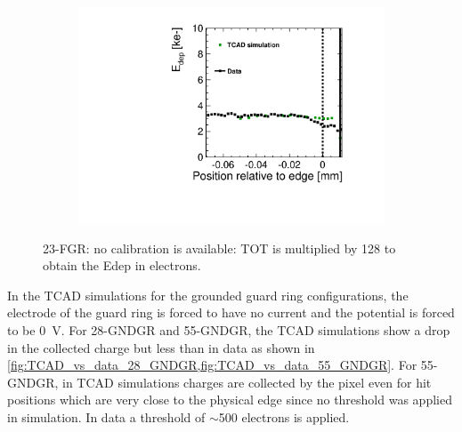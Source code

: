 \begin{figure}[htbp]
  \centering
  \begin{subfigure}[b]{0.5\textwidth}

    \caption{}
  \end{subfigure}\hfill
  \begin{subfigure}[b]{0.5\textwidth}
    \includegraphics[width=\textwidth]{figures/ActiveEdge/TCAD_data_23_FGR.pdf}
    \caption{}
  \end{subfigure}
  \caption{23-FGR: no calibration is available: TOT is multiplied by 128 to obtain the Edep in electrons.}
  \label{fig:TCAD_vs_data_23_FGR}
\end{figure}

In the TCAD simulations for the grounded guard ring configurations,
the electrode of the guard ring is forced to have no current and the
potential is forced to be 0~V. For 28-GNDGR and 55-GNDGR, the TCAD
simulations show a drop in the collected charge but less than in data
as shown in
\cref{fig:TCAD_vs_data_28_GNDGR,fig:TCAD_vs_data_55_GNDGR}. For
55-GNDGR, in TCAD simulations charges are collected by the pixel even
for hit positions which are very close to the physical edge since no
threshold was applied in simulation. In data a threshold of $\sim$500
electrons is applied.


